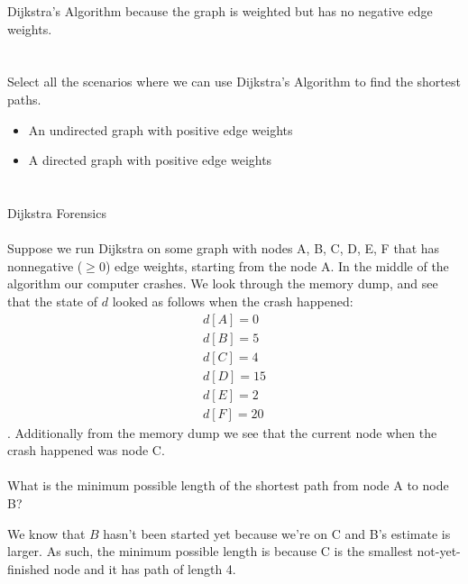 \documentclass [12pt]{article}
\begin{document}
\begin{Solution}
Dijkstra's Algorithm because the graph is weighted but has no negative edge weights.
\end{Solution}


\section{} Select all the scenarios where we can use Dijkstra's Algorithm to find the shortest paths.

\begin{Solution}
\begin{itemize}
    \item An undirected graph with positive edge weights
    \item A directed graph with positive edge weights
\end{itemize}
\end{Solution}


\section{} Dijkstra Forensics
\paragraph{}
Suppose we run Dijkstra on some graph with nodes A, B, C, D, E, F that has nonnegative ($\geq 0$) edge weights, starting from the node A. In the middle of the algorithm our computer crashes. We look through the memory dump, and see that the state of $d$ looked as follows when the crash happened: 
\begin{align*}
d[A] = 0 \\
d[B] = 5 \\ 
d[C] = 4 \\ 
d[D] = 15 \\
d[E] = 2 \\
d[F] = 20 
\end{align*}.
Additionally from the memory dump we see that the current node when the crash happened was node C.
\paragraph{}
What is the minimum possible length of the shortest path from node A to node B?

\begin{Solution}
We know that $B$ hasn't been started yet because we're on C and B's estimate is larger. As such, the minimum possible length is because C is the smallest not-yet-finished node and it has path of length 4.
\end{Solution}
\end{document}
